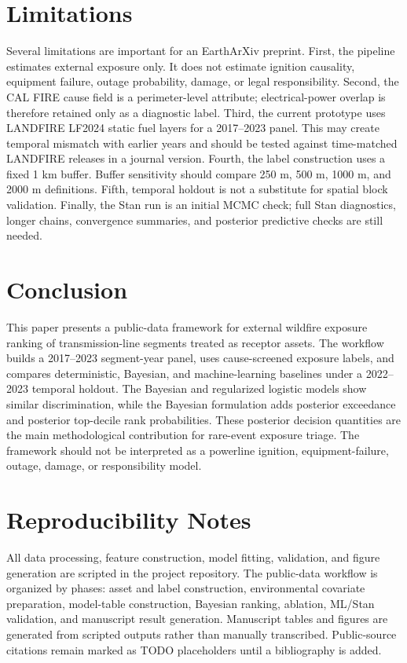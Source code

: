 \documentclass[11pt]{article}
\begin{document}
\section{Limitations}

Several limitations are important for an EarthArXiv preprint. First, the
pipeline estimates external exposure only. It does not estimate ignition
causality, equipment failure, outage probability, damage, or legal
responsibility. Second, the CAL FIRE cause field is a perimeter-level attribute;
electrical-power overlap is therefore retained only as a diagnostic label.
Third, the current prototype uses LANDFIRE LF2024 static fuel layers for a
2017--2023 panel. This may create temporal mismatch with earlier years and
should be tested against time-matched LANDFIRE releases in a journal version.
Fourth, the label construction uses a fixed 1 km buffer. Buffer sensitivity
should compare 250 m, 500 m, 1000 m, and 2000 m definitions. Fifth, temporal
holdout is not a substitute for spatial block validation. Finally, the Stan run
is an initial MCMC check; full Stan diagnostics, longer chains, convergence
summaries, and posterior predictive checks are still needed.

\section{Conclusion}

This paper presents a public-data framework for external wildfire exposure
ranking of transmission-line segments treated as receptor assets. The workflow
builds a 2017--2023 segment-year panel, uses cause-screened exposure labels, and
compares deterministic, Bayesian, and machine-learning baselines under a
2022--2023 temporal holdout. The Bayesian and regularized logistic models show
similar discrimination, while the Bayesian formulation adds posterior
exceedance and posterior top-decile rank probabilities. These posterior decision
quantities are the main methodological contribution for rare-event exposure
triage. The framework should not be interpreted as a powerline ignition,
equipment-failure, outage, damage, or responsibility model.

\appendix
\section{Reproducibility Notes}

All data processing, feature construction, model fitting, validation, and figure
generation are scripted in the project repository. The public-data workflow is
organized by phases: asset and label construction, environmental covariate
preparation, model-table construction, Bayesian ranking, ablation, ML/Stan
validation, and manuscript result generation. Manuscript tables and figures are
generated from scripted outputs rather than manually transcribed. Public-source
citations remain marked as TODO placeholders until a bibliography is added.
\end{document}
